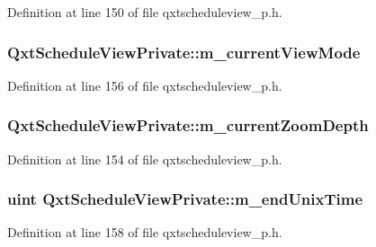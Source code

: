 Definition at line 150 of file qxtscheduleview\-\_\-p.\-h.

\hypertarget{class_qxt_schedule_view_private_acf0f9a88b9225a5f1263a27914e6fc87}{
\subsubsection[{m\-\_\-current\-View\-Mode}]{ Qxt\-Schedule\-View\-Private\-::m\-\_\-current\-View\-Mode}}\label{class_qxt_schedule_view_private_acf0f9a88b9225a5f1263a27914e6fc87}


Definition at line 156 of file qxtscheduleview\-\_\-p.\-h.

\hypertarget{class_qxt_schedule_view_private_a149d1085a5634b54038df67d5205bacc}{
\subsubsection[{m\-\_\-current\-Zoom\-Depth}]{ Qxt\-Schedule\-View\-Private\-::m\-\_\-current\-Zoom\-Depth}}\label{class_qxt_schedule_view_private_a149d1085a5634b54038df67d5205bacc}


Definition at line 154 of file qxtscheduleview\-\_\-p.\-h.

\hypertarget{class_qxt_schedule_view_private_ace36106f3daeff15a9fd29aec2b72c4c}{
\subsubsection[{m\-\_\-end\-Unix\-Time}]{\setlength{\rightskip}{0pt plus 5cm}uint Qxt\-Schedule\-View\-Private\-::m\-\_\-end\-Unix\-Time}}\label{class_qxt_schedule_view_private_ace36106f3daeff15a9fd29aec2b72c4c}


Definition at line 158 of file qxtscheduleview\-\_\-p.\-h.

